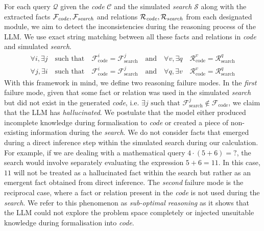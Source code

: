 \documentclass{article} %
\begin{document}
For each query $\mathcal{Q}$ given the \emph{code} $\mathcal{C}$ and the simulated \emph{search} $\mathcal{S}$ along with the extracted facts $\mathcal{F}_{\text{\emph{code}}}, \mathcal{F}_{\text{\emph{search}}}$ and relations $\mathcal{R}_{\text{\emph{code}}}, \mathcal{R}_{\text{\emph{search}}}$ from each designated module, we aim to detect the inconsistencies during the reasoning process of the LLM. We use exact string matching between all these facts and relations in \emph{code} and simulated \emph{search}.
%
\begin{gather}
\forall i, \exists j \quad \text{such that} \quad \mathcal{F}_{\text{code}}^i = \mathcal{F}_{\text{search}}^j \quad \text{and} \quad \forall v, \exists q \quad \mathcal{R}_{\text{code}}^v = \mathcal{R}_{\text{search}}^q \\
\forall j, \exists i \quad \text{such that} \quad \mathcal{F}_{\text{code}}^i = \mathcal{F}_{\text{search}}^j \quad \text{and} \quad \forall q, \exists v \quad \mathcal{R}_{\text{code}}^v = \mathcal{R}_{\text{search}}^q
\end{gather}
%
With this framework in mind, we define two reasoning failure modes. 
%
In the \emph{first} failure mode, given that some fact or relation was used in the simulated \emph{search} but did not exist in the generated \emph{code}, i.e. $\exists j \text{ such that } \mathcal{F}_{\text{search}}^j \notin \mathcal{F}_{\text{code}}$, we claim that the LLM has \emph{hallucinated}. We postulate that the model either produced incomplete knowledge during formalisation to \emph{code} or created a piece of non-existing information during the \emph{search}. We do not consider facts that emerged during a direct inference step within the simulated search during our calculation. For example, if we are dealing with a mathematical query $4\cdot (5+6) = ?$, the search would involve separately evaluating the expression $5+6=11$. In this case, $11$ will not be treated as a hallucinated fact within the search but rather as an emergent fact obtained from direct inference.   
%
The \emph{second} failure mode is the reciprocal case, where a fact or relation present in the \emph{code} is not used during the \emph{search}. We refer to this phenomenon as \emph{sub-optimal reasoning} as it shows that the LLM could not explore the problem space completely or injected unsuitable knowledge during formalisation into \emph{code}. 
\end{document}
